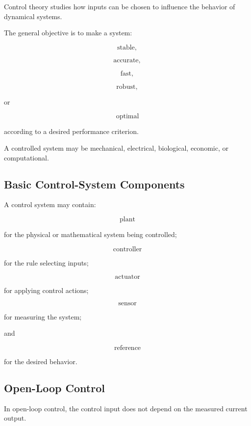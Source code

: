Control theory studies how inputs can be chosen to influence the behavior of
dynamical systems.

The general objective is to make a system:

\[
\boxed{
\text{stable},
}
\]

\[
\boxed{
\text{accurate},
}
\]

\[
\boxed{
\text{fast},
}
\]

\[
\boxed{
\text{robust},
}
\]

or

\[
\boxed{
\text{optimal}
}
\]

according to a desired performance criterion.

A controlled system may be mechanical, electrical, biological, economic, or
computational.

\subsection{Basic Control-System Components}
\label{subsec:control-system-components}

A control system may contain:

\[
\boxed{
\text{plant}
}
\]

for the physical or mathematical system being controlled;

\[
\boxed{
\text{controller}
}
\]

for the rule selecting inputs;

\[
\boxed{
\text{actuator}
}
\]

for applying control actions;

\[
\boxed{
\text{sensor}
}
\]

for measuring the system;

and

\[
\boxed{
\text{reference}
}
\]

for the desired behavior.

\subsection{Open-Loop Control}
\label{subsec:open-loop-control}

In open-loop control, the control input does not depend on the measured
current output.

